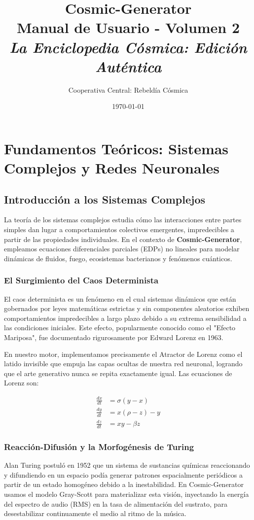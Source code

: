 \documentclass[12pt, openany]{book}
\title{\Huge \textbf{Cosmic-Generator} \\ \vspace{0.5cm} \Huge \textbf{Manual de Usuario - Volumen 2} \\ \vspace{1cm} \Large \textit{La Enciclopedia Cósmica: Edición Auténtica}}
\author{Cooperativa Central: Rebeldía Cósmica}
\date{\today}
\begin{document}
\maketitle
\tableofcontents
\newpage
\part{Fundamentos Teóricos: Sistemas Complejos y Redes Neuronales}


\chapter{Introducción a los Sistemas Complejos}
La teoría de los sistemas complejos estudia cómo las interacciones entre partes simples dan lugar a comportamientos colectivos emergentes, impredecibles a partir de las propiedades individuales. En el contexto de \textbf{Cosmic-Generator}, empleamos ecuaciones diferenciales parciales (EDPs) no lineales para modelar dinámicas de fluidos, fuego, ecosistemas bacterianos y fenómenos cuánticos.

\section{El Surgimiento del Caos Determinista}
El caos determinista es un fenómeno en el cual sistemas dinámicos que están gobernados por leyes matemáticas estrictas y sin componentes aleatorios exhiben comportamientos impredecibles a largo plazo debido a su extrema sensibilidad a las condiciones iniciales. Este efecto, popularmente conocido como el "Efecto Mariposa", fue documentado rigurosamente por Edward Lorenz en 1963. 

En nuestro motor, implementamos precisamente el Atractor de Lorenz como el latido invisible que empuja las capas ocultas de nuestra red neuronal, logrando que el arte generativo nunca se repita exactamente igual. Las ecuaciones de Lorenz son:

\begin{align}
\frac{dx}{dt} &= \sigma(y - x) \\
\frac{dy}{dt} &= x(\rho - z) - y \\
\frac{dz}{dt} &= xy - \beta z
\end{align}

\section{Reacción-Difusión y la Morfogénesis de Turing}
Alan Turing postuló en 1952 que un sistema de sustancias químicas reaccionando y difundiendo en un espacio podía generar patrones espacialmente periódicos a partir de un estado homogéneo debido a la inestabilidad. En Cosmic-Generator usamos el modelo Gray-Scott para materializar esta visión, inyectando la energía del espectro de audio (RMS) en la tasa de alimentación del sustrato, para desestabilizar continuamente el medio al ritmo de la música.
\end{document}
